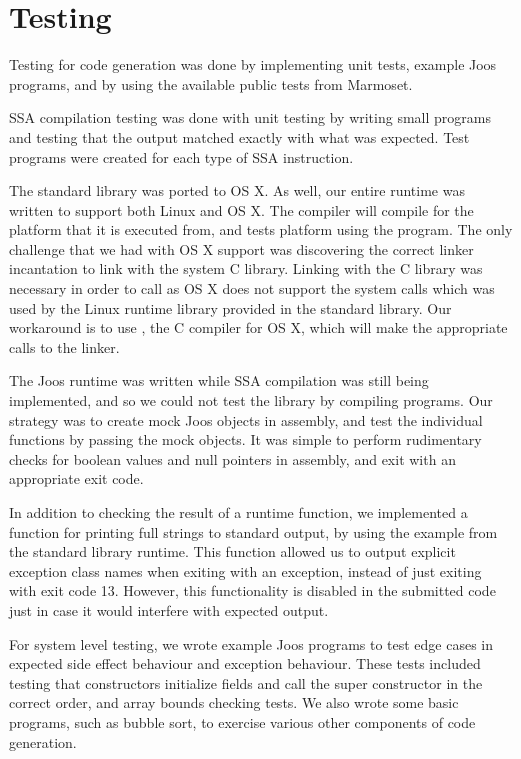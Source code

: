 \documentclass[pdftex,11pt,a4paper]{article}
\begin{document}
\section{Testing}

Testing for code generation was done by implementing unit tests,
example Joos programs, and by using the available public tests from
Marmoset.

SSA compilation testing was done with unit testing by writing small
programs and testing that the output matched exactly with what was
expected. Test programs were created for each type of SSA
instruction.

The standard library  was ported to OS X. As well, our
entire runtime was written to support both  Linux and  OS
X. The compiler will compile for the platform that it is executed
from, and tests platform using the  program. The only
challenge that we had with OS X support was discovering the correct
linker incantation to link with the system C library. Linking with the
C library was necessary in order to call  as OS X does not
support the system calls which was used by the Linux runtime library
provided in the standard library. Our workaround is to use
, the C compiler for OS X, which will make the appropriate
calls to the linker.

The Joos runtime was written while SSA compilation was still being
implemented, and so we could not test the library by compiling
programs. Our strategy was to create mock Joos objects in assembly,
and test the individual functions by passing the mock objects. It was
simple to perform rudimentary checks for boolean values and null
pointers in assembly, and exit with an appropriate exit code.

In addition to checking the result of a runtime function, we
implemented a function for printing full strings to standard output,
by using the example from the standard library runtime. This function
allowed us to output explicit exception class names when exiting with
an exception, instead of just exiting with exit code 13. However, this
functionality is disabled in the submitted code just in case it would
interfere with expected output.

For system level testing, we wrote example Joos programs to test edge
cases in expected side effect behaviour and exception behaviour. These
tests included testing that constructors initialize fields and call the
super constructor in the correct order, and array bounds checking
tests. We also wrote some basic programs, such as bubble sort, to
exercise various other components of code generation.
\end{document}
